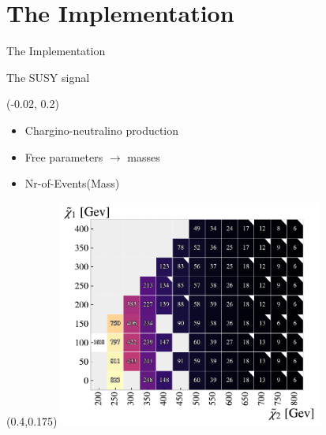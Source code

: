 \documentclass[UKenglish]{beamer}
\begin{document}
   

\section{The Implementation}
\begin{frame}{The Implementation}
    \tableofcontents[currentsection]
\end{frame}

\begin{frame}{The SUSY signal}
    \begin{textblock}{0.4}(-0.02, 0.2)
        \begin{itemize}
            \item Chargino-neutralino production
            \item Free parameters $\rightarrow$ masses 
            \item Nr-of-Events(Mass)
        \end{itemize}
    \end{textblock}
    \begin{textblock}{.9}(0.4,0.175)
        \includegraphics[width=0.65\textwidth]{figures/Signal/NrSignalEvents.pdf}
    \end{textblock}
\end{frame}
\end{document}
